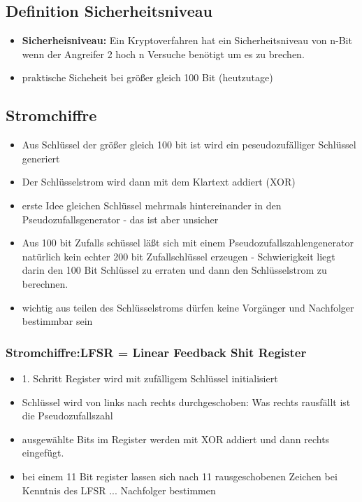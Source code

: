 \documentclass[a4paper,10pt]{scrartcl}
\begin{document}
\subsection{Definition Sicherheitsniveau}

\begin{itemize}
\item \textbf{Sicherheisniveau: } Ein Kryptoverfahren hat ein Sicherheitsniveau von n-Bit wenn der Angreifer 2 hoch n Versuche benötigt um es zu brechen.
\item praktische Sicheheit bei größer gleich 100 Bit (heutzutage)
\end{itemize}


\subsection{Stromchiffre}

\begin{itemize}
 \item Aus Schlüssel der größer gleich 100 bit ist wird ein peseudozufälliger Schlüssel generiert
 \item Der Schlüsselstrom wird dann mit dem Klartext addiert (XOR)
 \item erste Idee gleichen Schlüssel mehrmals hintereinander in den Pseudozufallsgenerator - das ist aber unsicher
 \item Aus 100 bit Zufalls schüssel läßt sich mit einem Pseudozufallszahlengenerator natürlich kein echter 200 bit Zufallschlüssel erzeugen -
 Schwierigkeit liegt darin den 100 Bit Schlüssel zu erraten und dann den Schlüsselstrom zu berechnen.
 \item wichtig aus teilen des Schlüsselstroms dürfen keine Vorgänger und Nachfolger bestimmbar sein
 
\end{itemize}

 
 \subsubsection{Stromchiffre:LFSR = Linear Feedback Shit Register}
 
 \begin{itemize}
  \item 1. Schritt Register wird mit zufälligem Schlüssel initialisiert 
  \item Schlüssel wird von links nach rechts durchgeschoben: Was rechts rausfällt ist die Pseudozufallszahl
  \item ausgewählte Bits im Register werden mit XOR addiert und dann rechts eingefügt.
  \item bei einem 11 Bit register lassen sich nach 11 rausgeschobenen Zeichen bei Kenntnis des LFSR ... Nachfolger bestimmen
 \end{itemize}
 
\end{document}
